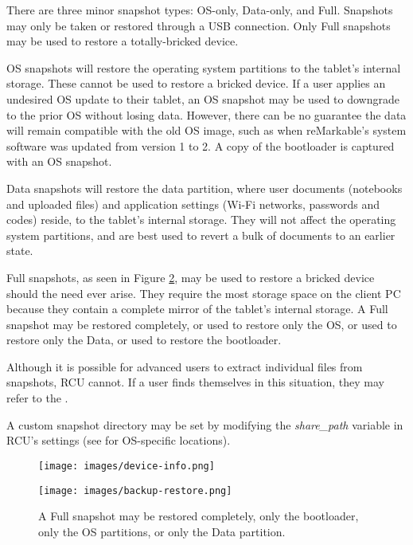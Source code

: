 There are three minor snapshot types: OS-only, Data-only, and Full. Snapshots may only be taken or restored through a USB connection. Only Full snapshots may be used to restore a totally-bricked device.

OS snapshots will restore the operating system partitions to the tablet's internal storage. These cannot be used to restore a bricked device. If a user applies an undesired OS update to their tablet, an OS snapshot may be used to downgrade to the prior OS without losing data. However, there can be no guarantee the data will remain compatible with the old OS image, such as when reMarkable's system software was updated from version 1 to 2. A copy of the bootloader is captured with an OS snapshot.

Data snapshots will restore the data partition, where user documents (notebooks and uploaded files) and application settings (Wi-Fi networks, passwords and codes) reside, to the tablet's internal storage. They will not affect the operating system partitions, and are best used to revert a bulk of documents to an earlier state.

Full snapshots, as seen in Figure \ref{fig:snapshotrestore}, may be used to restore a bricked device should the need ever arise. They require the most storage space on the client PC because they contain a complete mirror of the tablet's internal storage. A Full snapshot may be restored completely, or used to restore only the OS, or used to restore only the Data, or used to restore the bootloader.

Although it is possible for advanced users to extract individual files from snapshots, RCU cannot. If a user finds themselves in this situation, they may refer to the .

A custom snapshot directory may be set by modifying the \textit{share\_path} variable in RCU's settings (see  for OS-specific locations).


\newpage
\mbox{}
\vfill
\begin{figure}[h]
  \centering
  \texttt{[image: images/device-info.png]}
  \caption{}
  \label{fig:deviceinfo}
\end{figure}

\vfill

\begin{figure}[h]
  \centering
  \texttt{[image: images/backup-restore.png]}
  \caption{A Full snapshot may be restored completely, only the bootloader, only the OS partitions, or only the Data partition.}
  \label{fig:snapshotrestore}
\end{figure}

